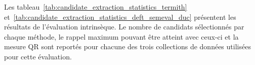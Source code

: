         Les tableau~\ref{tab:candidate_extraction_statistics_termith}
        et~\ref{tab:candidate_extraction_statistics_deft_semeval_duc} présentent
        les résultats de l'évaluation intrinsèque. Le nombre de candidats
        sélectionnés par chaque méthode, le rappel maximum pouvant être atteint
        avec ceux-ci et la mesure QR sont reportés pour chacune des
        trois collections de données utilisées pour cette évaluation.
        \begin{table}[!h]
          \centering
          \caption{Résultats de l'évaluation intrinsèque des méthodes de
                   sélection des termes-clés candidats sur les collections de
                   données Termith
                   \label{tab:candidate_extraction_statistics_termith}}
        \end{table}
